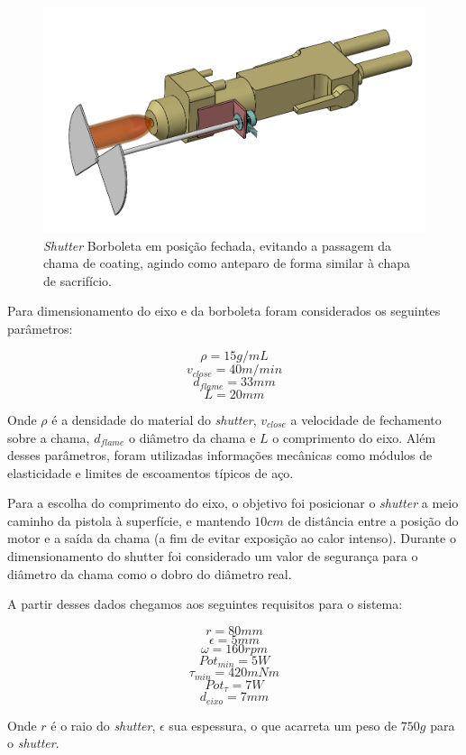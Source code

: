 \begin{figure}[h!]
\centering
	\includegraphics[width=\columnwidth]{figs/estudo/shutter/Shutter_Borboleta_Fechado}
	\caption{\textit{Shutter} Borboleta em posição fechada, evitando a passagem da chama
	de coating, agindo como anteparo de forma similar à chapa de sacrifício.}
	\label{fig::borboleta_fechada}
\end{figure}

Para dimensionamento do eixo e da borboleta foram considerados os seguintes
parâmetros:

\[\rho = 15 g/mL\]
\[v_{close} = 40 m/min\]
\[d_{flame} = 33mm\]
\[L = 20mm\]

Onde $\rho$ é a densidade do material do \textit{shutter}, $v_{close}$ a
velocidade de fechamento sobre a chama, $d_{flame}$ o diâmetro da chama e $L$ o
comprimento do eixo. Além desses parâmetros, foram utilizadas informações
mecânicas como módulos de elasticidade e limites de escoamentos típicos de aço.

Para a escolha do comprimento do eixo, o objetivo foi posicionar o
\textit{shutter} a meio caminho da pistola à superfície, e mantendo $10cm$ de
distância entre a posição do motor e a saída da chama (a fim de evitar
exposição ao calor intenso). Durante o dimensionamento do shutter foi
considerado um valor de segurança para o diâmetro da chama como o dobro do
diâmetro real.

A partir desses dados chegamos aos seguintes requisitos para o sistema:

\[ r = 80 mm\]
\[ \epsilon = 5 mm\]
\[ \omega = 160 rpm\]
\[ {Pot}_{min} = 5 W \]
\[ \tau_{min} = 420 mNm \]
\[ Pot_{\tau} = 7 W \]
\[ d_{eixo} = 7 mm\]

Onde $r$ é o raio do \textit{shutter}, $\epsilon$ sua espessura, o que acarreta
um peso de $750 g$ para o \textit{shutter}.

